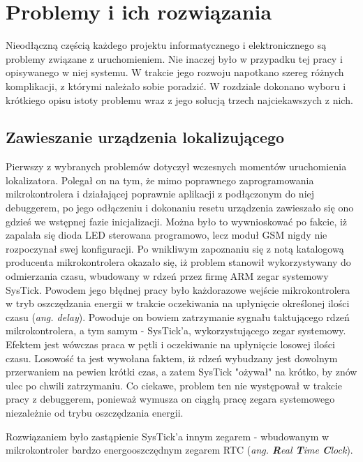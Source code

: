\chapter{Problemy i ich rozwiązania}
\label{problems_and_solutions}

Nieodłączną częścią każdego projektu informatycznego i elektronicznego są problemy związane z uruchomieniem. Nie inaczej było w przypadku tej pracy i opisywanego w niej systemu. W trakcie jego rozwoju napotkano szereg różnych komplikacji, z którymi należało sobie poradzić. W rozdziale dokonano wyboru i krótkiego opisu istoty problemu wraz z jego solucją trzech najciekawszych z nich.


\section{Zawieszanie urządzenia lokalizującego}

Pierwszy z wybranych problemów dotyczył wczesnych momentów uruchomienia lokalizatora. Polegał on na tym, że mimo poprawnego zaprogramowania mikrokontrolera i działającej poprawnie aplikacji z podłączonym do niej debuggerem, po jego odłączeniu i dokonaniu resetu urządzenia zawieszało się ono gdzieś we wstępnej fazie inicjalizacji. Można było to wywnioskować po fakcie, iż zapalała się dioda LED sterowana programowo, lecz moduł GSM nigdy nie rozpoczynał swej konfiguracji. Po wnikliwym zapoznaniu się z notą katalogową producenta mikrokontrolera okazało się, iż problem stanowił wykorzystywany do odmierzania czasu, wbudowany w rdzeń przez firmę ARM zegar systemowy SysTick. Powodem jego błędnej pracy było każdorazowe wejście mikrokontrolera w tryb oszczędzania energii w trakcie oczekiwania na upłynięcie określonej ilości czasu (\textit{ang. delay}). Powoduje on bowiem zatrzymanie sygnału taktującego rdzeń mikrokontrolera, a tym samym - SysTick'a, wykorzystującego zegar systemowy. Efektem jest wówczas praca w pętli i oczekiwanie na upłynięcie losowej ilości czasu. Losowość ta jest wywołana faktem, iż rdzeń wybudzany jest dowolnym przerwaniem na pewien krótki czas, a zatem SysTick "ożywał" na krótko, by znów ulec po chwili zatrzymaniu. Co ciekawe, problem ten nie występował w trakcie pracy z debuggerem, ponieważ wymusza on ciągłą pracę zegara systemowego niezależnie od trybu oszczędzania energii. 

Rozwiązaniem było zastąpienie SysTick'a innym zegarem - wbudowanym w mikrokontroler bardzo energooszczędnym zegarem RTC (\textit{ang. \textbf{R}eal \textbf{T}ime \textbf{C}lock}).

